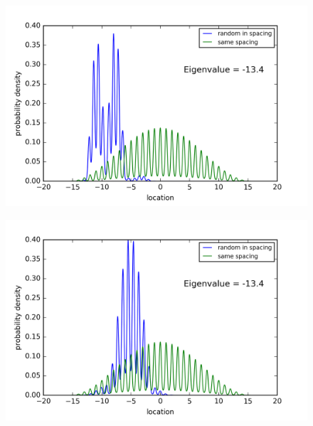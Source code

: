\begin{figure}[!htbh]
\centering
\begin{minipage}{.45\textwidth}
  \centering
  \includegraphics[width=1.1\linewidth]{Graphics/10_0_1th_Lowest_Rand0_8.png}
  \label{fig:Area10_1thlowestRand0.8}
\end{minipage}\qquad
\begin{minipage}{.45\textwidth}
  \centering
  \includegraphics[width=1.1\linewidth]{Graphics/10_0_1th_Lowest_Rand0_9.png}
  \label{fig:Area10_1thlowestRand0.9}
\end{minipage}
\end{figure}

